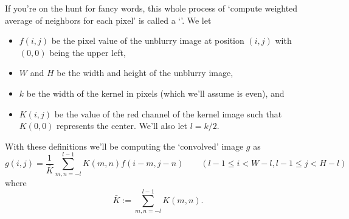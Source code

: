 \documentclass[11pt]{article}
\begin{document}
If you're on the hunt for fancy words, this whole process of `compute
weighted average of neighbors for each pixel' is called a
`'.
We let
\begin{itemize}
  \item $f(i,j)$ be the pixel value of the unblurry image at position $(i,j)$ with $(0,0)$
    being the upper left,
  \item $W$ and $H$ be the width and height of the unblurry image,
  \item $k$ be the width of the kernel in pixels (which
    we'll assume is even), and
  \item $K(i,j)$ be the value of the red channel of the
    kernel image such that $K(0,0)$ represents the center.
    We'll also let $l=k/2$.
\end{itemize}
With these definitions we'll be computing the `convolved' image $g$ as
\[
  g(i,j)=\frac{1}{\bar K} \sum_{m,n=-l}^{l-1} K(m,n)f(i-m,j-n)
  \qquad
  (l-1\le i <W-l,l-1\le j<H-l)
\]
where
\[
  \bar K:=\sum_{m,n=-l}^{l-1} K(m,n).
\]
\end{document}
